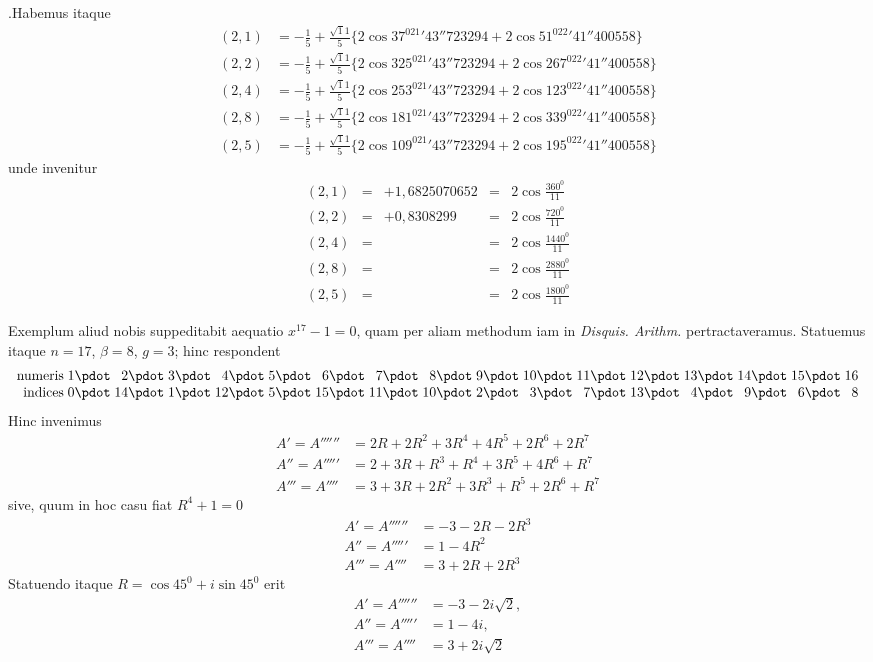.Habemus itaque
\[
\begin{aligned}
(2,1)&=-\frac15+\frac{\surd11}5\{2\cos37^021'43''723294+2\cos51^022'41''400558\}\\
(2,2)&=-\frac15+\frac{\surd11}5\{2\cos325^021'43''723294+2\cos267^022'41''400558\}\\
(2,4)&=-\frac15+\frac{\surd11}5\{2\cos253^021'43''723294+2\cos123^022'41''400558\}\\
(2,8)&=-\frac15+\frac{\surd11}5\{2\cos181^021'43''723294+2\cos339^022'41''400558\}\\
(2,5)&=-\frac15+\frac{\surd11}5\{2\cos109^021'43''723294+2\cos195^022'41''400558\}
\end{aligned}
\]
unde invenitur
\[
\begin{array}{rclcl}
(2,1)&=&+1{,}6825070652&=&2\cos\frac{360^0}{11}\\[3pt]
(2,2)&=&+0{,}8308299&=&2\cos\frac{720^0}{11}\\[3pt]
(2,4)&=&&=&2\cos\frac{1440^0}{11}\\[3pt]
(2,8)&=&&=&2\cos\frac{2880^0}{11}\\[3pt]
(2,5)&=&&=&2\cos\frac{1800^0}{11}
\end{array}
\]

Exemplum aliud nobis suppeditabit aequatio $x^{17}-1=0$, quam per aliam methodum iam in \emph{Disquis. Arithm.} pertractaveramus. Statuemus itaque $n=17$, $\beta=8$, $g=3$; hinc respondent
\[
\begin{array}{r*{16}{@{\;}r}}
\text{numeris}&1\pdot&2\pdot&3\pdot&4\pdot&5\pdot&6\pdot&7\pdot&8\pdot&9\pdot&10\pdot&11\pdot&12\pdot&13\pdot&14\pdot&15\pdot&16\\
\text{indices}&0\pdot&14\pdot&1\pdot&12\pdot&5\pdot&15\pdot&11\pdot&10\pdot&2\pdot&3\pdot&7\pdot&13\pdot&4\pdot&9\pdot&6\pdot&8
\end{array}
\]
Hinc invenimus
\[
\begin{aligned}
A'=A''''''&=2R+2R^2+3R^4+4R^5+2R^6+2R^7\\
A''=A'''''&=2+3R+R^3+R^4+3R^5+4R^6+R^7\\
A'''=A''''&=3+3R+2R^2+3R^3+R^5+2R^6+R^7
\end{aligned}
\]
sive, quum in hoc casu fiat $R^4+1=0$
\[
\begin{aligned}
A'=A''''''&=-3-2R-2R^3\\
A''=A'''''&=1-4R^2\\
A'''=A''''&=3+2R+2R^3
\end{aligned}
\]
Statuendo itaque $R=\cos45^0+i\sin45^0$ erit
\[
\begin{aligned}
A'=A''''''&=-3-2i\surd2,\\
A''=A'''''&=1-4i,\\
A'''=A''''&=3+2i\surd2
\end{aligned}
\]

